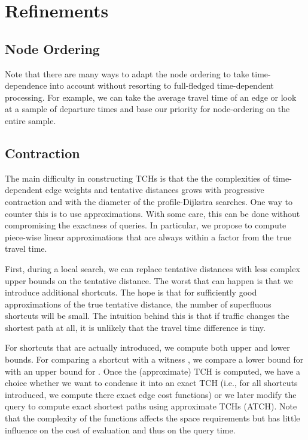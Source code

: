 \documentclass[12pt]{article}
\begin{document}
\section{Refinements}\label{ss:crefinements}

\subsection{Node Ordering}\label{ss:orefinements}

Note that there are many ways to adapt the
node ordering to take time-dependence into account without resorting
to full-fledged time-dependent processing. For example, we can take
the average travel time of an edge or look at a sample of departure times
and base our priority for node-ordering on the entire sample.

\subsection{Contraction}\label{ss:crefinements}

The main difficulty in constructing TCHs is that 
the the complexities of time-dependent edge weights and
tentative distances grows with progressive contraction
and with the diameter of the profile-Dijkstra searches.
One way to counter this is to use approximations.
With some care, this can be done without compromising 
the exactness of queries.
In particular, we propose to compute piece-wise linear
approximations that are always within a factor  from the
true travel time.

First, during a local search, we can replace tentative distances with less complex
upper bounds on the tentative distance.
The worst that can happen is that we introduce additional shortcuts.
The hope is that for sufficiently good approximations of the true
tentative distance, the number of superfluous shortcuts will be small.
The intuition behind this is that if traffic changes the shortest path at all,
it is unlikely that the travel time difference is tiny.  

For shortcuts that are actually introduced, we compute both upper and lower bounds.
For comparing a shortcut  with a witness , we compare a lower bound for  
with an upper bound for . 
Once the (approximate) TCH is computed, we have a choice whether we 
want to condense it into an exact TCH (i.e., for all shortcuts
introduced, we compute there exact edge cost functions)
or we later modify the query to compute exact shortest paths using
approximate TCHs (ATCH). Note that
the complexity of the functions affects the space requirements but
has little influence on the cost of evaluation and thus on the query time.
\end{document}
